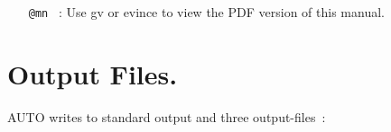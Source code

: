 \documentclass[12pt]{report}
\begin{document}
\begin{itemize}

\item[\tt @mn]~: Use {\cal gv} or {\cal evince} to view the PDF version of this manual.
\end{itemize}

\newpage

\chapter{ Output Files.} \label{ch:Output_files}
{\cal AUTO} writes to standard output and three output-files~:
\end{document}
